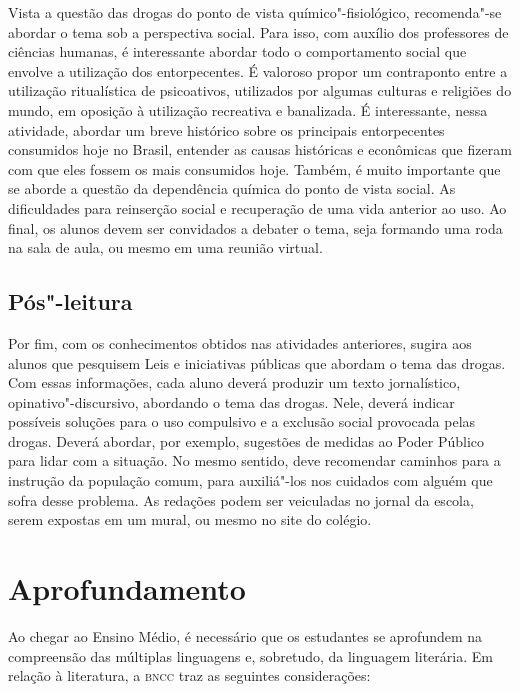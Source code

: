 \documentclass[11pt]{extarticle}
\begin{document}
Vista a questão das drogas do ponto de vista
químico"-fisiológico, recomenda"-se abordar o tema sob a perspectiva
social. Para isso, com auxílio dos professores de ciências humanas, é
interessante abordar todo o comportamento social que envolve a
utilização dos entorpecentes. É valoroso propor um contraponto entre a
utilização ritualística de psicoativos, utilizados por algumas culturas
e religiões do mundo, em oposição à utilização recreativa e banalizada.
É interessante, nessa atividade, abordar um breve histórico sobre os
principais entorpecentes consumidos hoje no Brasil, entender as causas
históricas e econômicas que fizeram com que eles fossem os mais
consumidos hoje. Também, é muito importante que se aborde a questão da
dependência química do ponto de vista social. As dificuldades para
reinserção social e recuperação de uma vida anterior ao uso. Ao final,
os alunos devem ser convidados a debater o tema, seja formando uma roda
na sala de aula, ou mesmo em uma reunião virtual.


\subsection{Pós"-leitura}

Por fim, com os conhecimentos obtidos nas atividades
anteriores, sugira aos alunos que pesquisem Leis e iniciativas públicas
que abordam o tema das drogas. Com essas informações, cada aluno deverá
produzir um texto jornalístico, opinativo"-discursivo, abordando o tema
das drogas. Nele, deverá indicar possíveis soluções para o uso
compulsivo e a exclusão social provocada pelas drogas. Deverá abordar,
por exemplo, sugestões de medidas ao Poder Público para lidar com a
situação. No mesmo sentido, deve recomendar caminhos para a instrução da
população comum, para auxiliá"-los nos cuidados com alguém que sofra
desse problema. As redações podem ser veiculadas no jornal da escola,
serem expostas em um mural, ou mesmo no site do colégio.

\section{Aprofundamento}

Ao chegar ao Ensino Médio, é necessário que os estudantes se aprofundem
na compreensão das múltiplas linguagens e, sobretudo, da linguagem
literária. Em relação à literatura, a \textsc{bncc} traz as seguintes
considerações:
\end{document}
